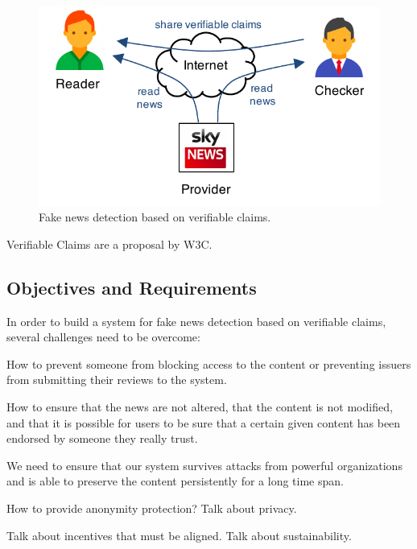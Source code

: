 
\begin{figure}[t]
  \centering
  \includegraphics[width=0.9\columnwidth]{figures/model.pdf}
  \vspace{-10pt}
  \caption{Fake news detection based on verifiable claims.}
  \label{fig:model}
\end{figure}

Verifiable Claims are a proposal by W3C. 


\subsection{Objectives and Requirements}

In order to build a system for fake news detection based on verifiable claims, several challenges need to be overcome:

 How to prevent someone from blocking access to the content or preventing issuers from submitting their reviews to the system.

 How to ensure that the news are not altered, that the content is not modified, and that it is possible for users to be sure that a certain given content has been endorsed by someone they really trust.

 We need to ensure that our system survives attacks from powerful organizations and is able to preserve the content persistently for a long time span.

 How to provide anonymity protection? Talk about privacy. 

 Talk about incentives that must be aligned. Talk about sustainability.
